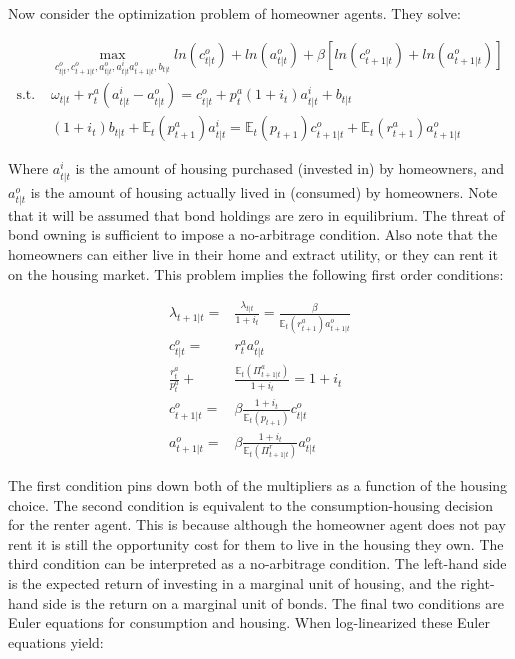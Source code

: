 \documentclass{article}
\begin{document}
Now consider the optimization problem of homeowner agents. They solve:

\begin{align}
    &\underset{c^o_{t|t}, c^o_{t+1|t}, a^o_{t|t}, a^i_{t|t} a^o_{t+1|t}, b_{t|t}}{\max} ln(c^o_{t|t}) + ln(a^o_{t|t}) + \beta[ln(c^o_{t+1|t}) + ln(a^o_{t+1|t})] \nonumber \\
    \text{s.t. }& \omega_{t|t} + r^a_t(a^i_{t|t} - a^o_{t|t}) = c^o_{t|t} + p^a_t (1 + i_t) a^i_{t|t} + b_{t|t} \nonumber \\
    & (1 + i_t) b_{t|t} + \mathbb{E}_t (p^a_{t+1}) a^i_{t|t} = \mathbb{E}_t(p_{t+1})c^o_{t+1|t} + \mathbb{E}_t(r^a_{t+1})a^o_{t+1|t}
\end{align}

Where $a^i_{t|t}$ is the amount of housing purchased (invested in) by homeowners, and $a^o_{t|t}$ is the amount of housing actually lived in (consumed) by homeowners. Note that it will be assumed that bond holdings are zero in equilibrium. The threat of bond owning is sufficient to impose a no-arbitrage condition. Also note that the homeowners can either live in their home and extract utility, or they can rent it on the housing market. This problem implies the following first order conditions:

\begin{align}
    \lambda_{t+1|t} =& \frac{\lambda_{t|t}}{1+i_t} = \frac{\beta}{\mathbb{E}_t(r^a_{t+1}) a^o_{t+1|t}} \label{ho_multiplier} \\
    c^o_{t|t} =& r^a_t a^o_{t|t} \label{ho_intertemporal} \\
    \frac{r^a_t}{p^a_t} +& \frac{\mathbb{E}_t(\Pi^a_{t+1|t})}{1+i_t} = 1+ i_t \label{no_arb} \\
    c^o_{t+1|t} =& \beta \frac{1 + i_t}{\mathbb{E}_t (p_{t+1})} c^o_{t|t} \label{ho_euler} \\
    a^o_{t+1|t} =& \beta \frac{1+i_t}{\mathbb{E}_t(\Pi^r_{t+1|t})} a^o_{t|t} \label{ho_hous_euler}
\end{align}

The first condition pins down both of the multipliers as a function of the housing choice. The second condition is equivalent to the consumption-housing decision for the renter agent. This is because although the homeowner agent does not pay rent it is still the opportunity cost for them to live in the housing they own. The third condition can be interpreted as a no-arbitrage condition. The left-hand side is the expected return of investing in a marginal unit of housing, and the right-hand side is the return on a marginal unit of bonds. The final two conditions are Euler equations for consumption and housing. When log-linearized these Euler equations yield:
\end{document}
